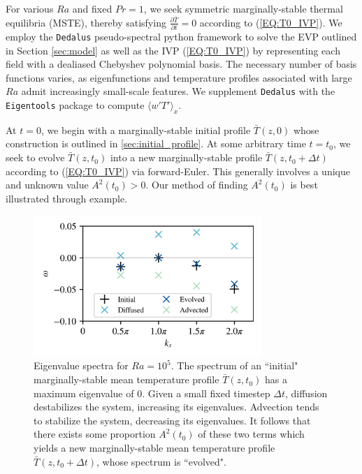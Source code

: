 \documentclass[reprint,amsmath,amssymb,aps]{revtex4-1}
\begin{document}
For various $Ra$ and fixed $Pr = 1$, we seek symmetric marginally-stable thermal equilibria (MSTE), thereby satisfying $\frac{\partial \bar{T}}{\partial t} = 0$ according to (\ref{EQ:T0_IVP}). 
We employ the \texttt{Dedalus} pseudo-spectral python framework to solve the EVP outlined in Section \ref{sec:model} as well as the IVP (\ref{EQ:T0_IVP}) by representing each field with a dealiased Chebyshev polynomial basis. 
The necessary number of basis functions varies, as eigenfunctions and temperature profiles associated with large $Ra$ admit increasingly small-scale features. 
We supplement \texttt{Dedalus} with the \texttt{Eigentools} package to compute $\langle w' T' \rangle_x$.

At $t = 0$, we begin with a marginally-stable initial profile $\bar{T}(z, 0)$ whose construction is outlined in \ref{sec:initial_profile}. 
At some arbitrary time $t = t_0$, we seek to evolve $\bar{T}(z, t_0)$ into a new marginally-stable profile $\bar{T}(z, t_0 + \Delta t)$ according to (\ref{EQ:T0_IVP}) via forward-Euler. 
This generally involves a unique and unknown value $A^2(t_0) > 0$. 
Our method of finding $A^2(t_0)$ is best illustrated through example.

\begin{figure}
    \includegraphics[width=3.4in]{EV_spectrum_ol.png}
    \caption{Eigenvalue spectra for $Ra = 10^5$. The spectrum of an ``initial" marginally-stable mean temperature profile $\bar{T}(z, t_0)$ has a maximum eigenvalue of 0. 
    Given a small fixed timestep $\Delta t$, diffusion destabilizes the system, increasing its eigenvalues. 
    Advection tends to stabilize the system, decreasing its eigenvalues. 
    It follows that there exists some proportion $A^2(t_0)$ of these two terms which yields a new marginally-stable mean temperature profile $\bar{T}(z, t_0 + \Delta t)$, whose spectrum is ``evolved".}
    \label{fig:iteration_spectra} 
\end{figure}
\end{document}
